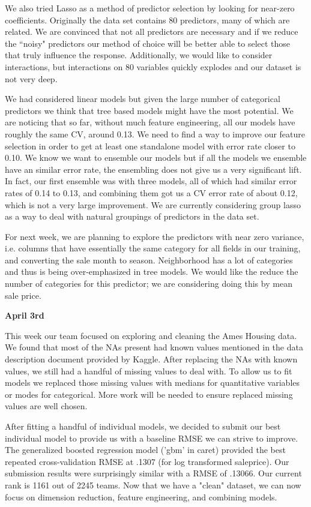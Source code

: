 \documentclass[12pt]{article}
\begin{document}
We also tried Lasso as a method of predictor selection by looking for near-zero coefficients.  Originally the data set contains 80 predictors, many of which are related.  We are convinced that not all predictors are necessary and if we reduce the ``noisy" predictors our method of choice will be better able to select those that truly influence the response.  Additionally, we would like to consider interactions, but interactions on 80 variables quickly explodes and our dataset is not very deep.

We had considered linear models but given the large number of categorical predictors we think that tree based models might have the most potential.  We are noticing that so far, without much feature engineering, all our models have roughly the same CV, around 0.13.  We need to find a way to improve our feature selection in order to get at least one standalone model with error rate closer to 0.10.  We know we want to ensemble our models but if all the models we ensemble have an similar error rate, the ensembling does not give us a very significant lift.  In fact, our first ensemble was with three models, all of which had similar error rates of 0.14 to 0.13, and combining them got us a CV error rate of about 0.12, which is not a very large improvement.  We are currently considering group lasso as a way to deal with natural groupings of predictors in the data set.

For next week, we are planning to explore the predictors with near zero variance, i.e. columns that have essentially the same category for all fields in our training, and converting the sale month to season.  Neighborhood has a lot of categories and thus is being over-emphasized in tree models.  We would like the reduce the number of categories for this predictor; we are considering doing this by mean sale price.


\textbf{April 3rd}

This week our team focused on exploring and cleaning the Ames Housing data. We found that most of the NAs present had known values mentioned in the data description document provided by Kaggle. After replacing the NAs with known values, we still had a handful of missing values to deal with. To allow us to fit models we replaced those missing values with medians for quantitative variables or modes for categorical. More work will be needed to ensure replaced missing values are well chosen.

After fitting a handful of individual models, we decided to submit our best individual model to provide us with a baseline RMSE we can strive to improve. The generalized boosted regression model ('gbm' in caret) provided the best repeated cross-validation RMSE at .1307 (for log transformed saleprice). Our submission results were surprisingly similar with a RMSE of .13066. Our current rank is 1161 out of 2245 teams. Now that we have a "clean" dataset, we can now focus on dimension reduction, feature engineering, and combining models.
\end{document}
